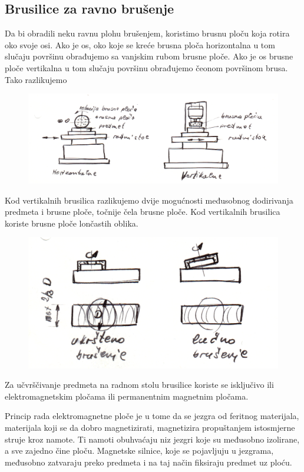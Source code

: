 \documentclass[a4paper,12pt]{article}
\numberwithin{figure}{section}
\begin{document}
\subsection{Brusilice za ravno brušenje}
Da bi obradili neku ravnu plohu brušenjem, koristimo brusnu ploču koja rotira oko svoje osi. Ako je os, oko koje se kreće brusna ploča horizontalna u tom slučaju površinu obrađujemo sa vanjskim rubom brusne ploče. Ako je os brusne ploče vertikalna u tom slučaju površinu obrađujemo čeonom površinom brusa. Tako razlikujemo
\begin{figure}[!h]
\centering
\includegraphics[scale=0.15]{image_28-1.png}
\end{figure}
\FloatBarrier
Kod vertikalnih brusilica razlikujemo dvije mogućnosti međusobnog dodirivanja predmeta i brusne ploče, točnije čela brusne ploče. Kod vertikalnih brusilica koriste brusne ploče lončastih oblika.
\begin{figure}[!h]
\centering
\includegraphics[scale=0.15]{image_28-2.png}
\end{figure}
\FloatBarrier
Za učvrščivanje predmeta na radnom stolu brusilice koriste se isključivo ili elektromagnetskim pločama ili permanentnim magnetnim pločama.\par
Princip rada elektromagnetne ploče je u tome da se jezgra od feritnog materijala, materijala koji se da dobro magnetizirati, magnetizira propuštanjem istosmjerne struje kroz namote. Ti namoti obuhvaćaju niz jezgri koje su međusobno izolirane, a sve zajedno čine ploču. Magnetske silnice, koje se pojavljuju u jezgrama, međusobno zatvaraju preko predmeta i na taj način fiksiraju predmet uz ploću.\par
\end{document}
